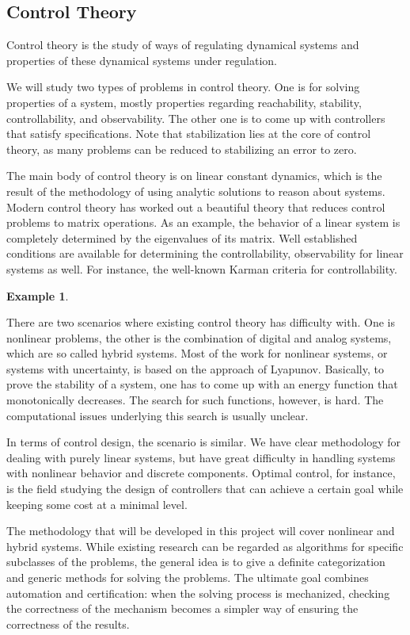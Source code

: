 \documentclass[10pt]{article}
\theoremstyle{definition}
\newtheorem{example}{Example}[section]
\begin{document}
\subsection{Control Theory} 

Control theory is the study of ways of regulating dynamical systems and properties of these dynamical systems under regulation. 

We will study two types of problems in control theory. One is for solving properties of a system, mostly properties regarding reachability, stability, controllability, and observability. The other one is to come up with controllers that satisfy specifications. Note that stabilization lies at the core of control theory, as many problems can be reduced to stabilizing an error to zero. 

The main body of control theory is on linear constant dynamics, which is the result of the methodology of using analytic solutions to reason about systems. Modern control theory has worked out a beautiful theory that reduces control problems to matrix operations. As an example, the behavior of a linear system is completely determined by the eigenvalues of its matrix. Well established conditions are available for determining the controllability, observability for linear systems as well. For instance, the well-known Karman criteria for controllability. 
\begin{example}

\end{example}
There are two scenarios where existing control theory has difficulty with. One is nonlinear problems, the other is the combination of digital and analog systems, which are so called hybrid systems. Most of the work for nonlinear systems, or systems with uncertainty, is based on the approach of Lyapunov. Basically, to prove the stability of a system, one has to come up with an energy function that monotonically decreases. The search for such functions, however, is hard. The computational issues underlying this search is usually unclear.~\cite{}

In terms of control design, the scenario is similar. We have clear methodology for dealing with purely linear systems, but have great difficulty in handling systems with nonlinear behavior and discrete components. Optimal control, for instance, is the field studying the design of controllers that can achieve a certain goal while keeping some cost at a minimal level. 

The methodology that will be developed in this project will cover nonlinear and hybrid systems. While existing research can be regarded as algorithms for specific subclasses of the problems, the general idea is to give a definite categorization and generic methods for solving the problems. The ultimate goal combines automation and certification: when the solving process is mechanized, checking the correctness of the mechanism becomes a simpler way of ensuring the correctness of the results. 
\end{document}
